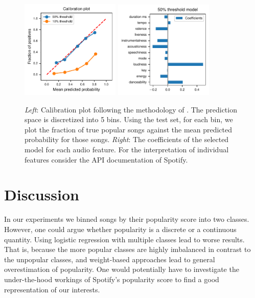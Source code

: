 \documentclass{article}
\begin{document}
\begin{figure}
  \includegraphics[width=0.42\textwidth]{../figures/calibration_combined.pdf}
  \qquad
  \includegraphics[width=0.42\textwidth]{../figures/logistic_coefs_50_threshold_model.pdf}
  \caption{\textit{Left}: Calibration plot following the methodology of \cite{niculescu-mizilPredictingGoodProbabilities2005}. The prediction space is discretized into 5 bins. Using the test set, for each bin, we plot the fraction of true popular songs against the mean predicted probability for those songs. \textit{Right}: The coefficients of the selected model for each audio feature. For the interpretation of individual features consider the API documentation of Spotify.}
  \label{fig:logis_eval}
\end{figure}

  

\section{Discussion}


In our experiments we binned songs by their popularity score into two classes. However, one could argue whether popularity is a discrete or a continuous quantity. Using logistic regression with multiple classes lead to worse results. That is, because the more popular classes are highly imbalanced in contrast to the unpopular classes, and weight-based approaches lead to general overestimation of popularity.
One would potentially have to investigate the under-the-hood workings of Spotify's popularity score to find a good representation of our interests.
\end{document}
